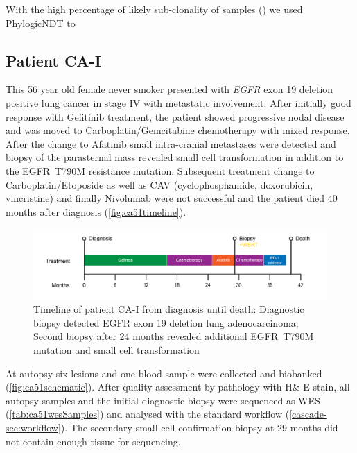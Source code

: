With the high percentage of likely sub-clonality of samples () we used PhylogicNDT to


\cleardoublepage




\subsection{Patient CA-I}
\label{cascade-sec:CA51}

This 56 year old female never smoker presented with \textit{EGFR} exon 19 deletion positive lung cancer in stage IV with metastatic involvement. After initially good response with Gefitinib treatment, the patient showed progressive nodal disease and was moved to Carboplatin/Gemcitabine chemotherapy with mixed response. After the change to Afatinib small intra-cranial metastases were detected and biopsy of the parasternal mass revealed small cell transformation in addition to the EGFR~T790M resistance mutation. Subsequent treatment change to Carboplatin/Etoposide as well as CAV (cyclophosphamide, doxorubicin, vincristine) and finally Nivolumab were not successful and the patient died 40 months after diagnosis (\autoref{fig:ca51timeline}).

\begin{figure}[ht]
	\centering
	\includegraphics[width=.99\linewidth]{Figures/CASCADE/CA51/CA-I_timeline}
	\caption[Timeline of patient CA-I from diagnosis until death]{Timeline of patient CA-I from diagnosis until death: Diagnostic biopsy detected EGFR exon 19 deletion lung adenocarcinoma; Second biopsy after 24 months revealed additional EGFR~T790M mutation and small cell transformation} \label{fig:ca51timeline}
\end{figure}

At autopsy six lesions and one blood sample were collected and biobanked (\autoref{fig:ca51schematic}). After quality assessment by pathology with H\& E stain, all autopsy samples and the initial diagnostic biopsy were sequenced as WES (\autoref{tab:ca51wesSamples}) and analysed with the standard workflow (\autoref{cascade-sec:workflow}). The secondary small cell confirmation biopsy at 29 months did not contain enough tissue for sequencing.

